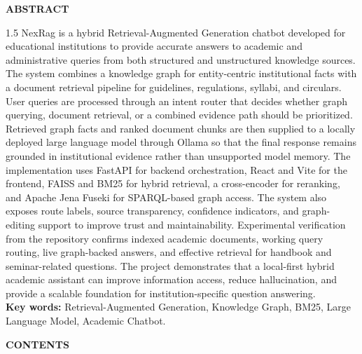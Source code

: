 \newpage
\thispagestyle{plain}

\begin{center}
            {\fontsize{14}{16}\selectfont \textbf{ABSTRACT}}
\end{center}

\vspace{0.2cm}

\begin{spacing}{1.5}
\fontsize{12}{14}\selectfont
NexRag is a hybrid Retrieval-Augmented Generation chatbot developed for educational institutions to provide accurate answers to academic and administrative queries from both structured and unstructured knowledge sources. The system combines a knowledge graph for entity-centric institutional facts with a document retrieval pipeline for guidelines, regulations, syllabi, and circulars. User queries are processed through an intent router that decides whether graph querying, document retrieval, or a combined evidence path should be prioritized. Retrieved graph facts and ranked document chunks are then supplied to a locally deployed large language model through Ollama so that the final response remains grounded in institutional evidence rather than unsupported model memory. The implementation uses FastAPI for backend orchestration, React and Vite for the frontend, FAISS and BM25 for hybrid retrieval, a cross-encoder for reranking, and Apache Jena Fuseki for SPARQL-based graph access. The system also exposes route labels, source transparency, confidence indicators, and graph-editing support to improve trust and maintainability. Experimental verification from the repository confirms indexed academic documents, working query routing, live graph-backed answers, and effective retrieval for handbook and seminar-related questions. The project demonstrates that a local-first hybrid academic assistant can improve information access, reduce hallucination, and provide a scalable foundation for institution-specific question answering.\\

\noindent\textbf{Key words:} Retrieval-Augmented Generation, Knowledge Graph, BM25, Large Language Model, Academic Chatbot.

\end{spacing}

\newpage
\begin{center}
            {\fontsize{14}{16}\selectfont \textbf{CONTENTS}}
\end{center}
\vspace{1cm}
\renewcommand{\arraystretch}{1.5}


